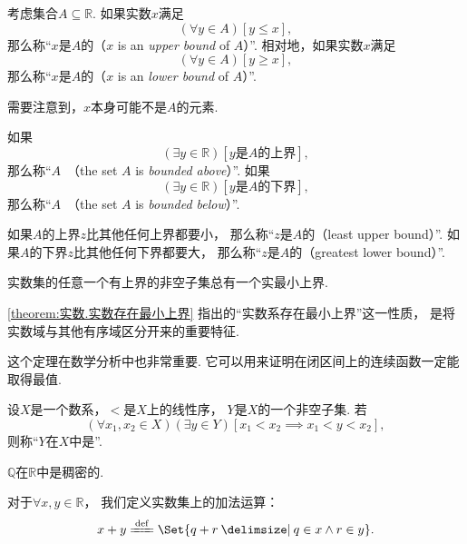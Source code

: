 考虑集合\(A \subseteq \mathbb{R}\).
如果实数\(x\)满足\[
	(\forall y \in A)[y \leq x],
\]
那么称“\(x\)是\(A\)的（\(x\) is an \emph{upper bound} of \(A\)）”.
相对地，如果实数\(x\)满足\[
	(\forall y \in A)[y \geq x],
\]
那么称“\(x\)是\(A\)的（\(x\) is an \emph{lower bound} of \(A\)）”.

需要注意到，\(x\)本身可能不是\(A\)的元素.

如果\[
	(\exists y\in\mathbb{R})
	[\text{\(y\)是\(A\)的上界}],
\]
那么称“\(A\)~（the set \(A\) is \emph{bounded above}）”.
如果\[
	(\exists y\in\mathbb{R})
	[\text{\(y\)是\(A\)的下界}],
\]
那么称“\(A\)~（the set \(A\) is \emph{bounded below}）”.

如果\(A\)的上界\(z\)比其他任何上界都要小，
那么称“\(z\)是\(A\)的（least upper bound）”.
如果\(A\)的下界\(z\)比其他任何下界都要大，
那么称“\(z\)是\(A\)的（greatest lower bound）”.

\begin{theorem}\label{theorem:实数.实数存在最小上界}
实数集的任意一个有上界的非空子集总有一个实最小上界.
\end{theorem}
\cref{theorem:实数.实数存在最小上界}
指出的“实数系存在最小上界”这一性质，
是将实数域与其他有序域区分开来的重要特征.

这个定理在数学分析中也非常重要.
它可以用来证明在闭区间上的连续函数一定能取得最值.

\begin{definition}
设\(X\)是一个数系，\(<\)是\(X\)上的线性序，
\(Y\)是\(X\)的一个非空子集.
若\[
	(\forall x_1,x_2 \in X)
	(\exists y \in Y)
	[x_1 < x_2 \implies x_1 < y < x_2],
\]
则称“\(Y\)在\(X\)中是”.
\end{definition}

\begin{proposition}
\(\mathbb{Q}\)在\(\mathbb{R}\)中是稠密的.
\end{proposition}

\begin{definition}
对于\(\forall x,y\in\mathbb{R}\)，
我们定义实数集上的加法运算：
\begin{equation}
	x + y \defeq \Set{
		q + r \given q \in x \land r \in y
	}.
\end{equation}
\end{definition}

